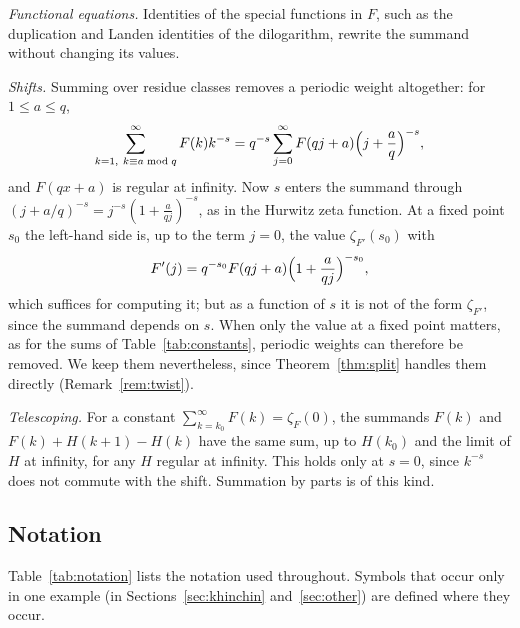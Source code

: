 \documentclass[11pt,reqno]{amsart}
\theoremstyle{definition}
\theoremstyle{remark}
\begin{document}
\emph{Functional equations.} Identities of the special functions in $F$, such as the duplication and Landen identities
of the dilogarithm, rewrite the summand without changing its values.

\emph{Shifts.} Summing over residue classes removes a periodic weight altogether: for $1 \le a \le q$,
\[
  \sum_{k=1,\ k\equiv a \bmod q}^{\infty}F(k)k^{-s} = q^{-s}\sum_{j=0}^{\infty}F(qj+a)\Bigl(j + \frac aq\Bigr)^{-s},
\]
and $F(qx+a)$ is regular at infinity. Now $s$ enters the summand through
$(j+a/q)^{-s} = j^{-s}(1+\frac{a}{qj})^{-s}$, as in the Hurwitz zeta function. At a fixed point $s_0$ the left-hand side
is, up to the term $j = 0$, the value $\zeta_{F'}(s_0)$ with
\[
  F'(j) = q^{-s_0}F(qj+a)\Bigl(1+\frac a{qj}\Bigr)^{-s_0},
\]
which suffices for computing it; but as a function of $s$ it is not of the form $\zeta_{F'}$, since the summand
depends on $s$. When only the value at a fixed point matters, as for the sums of Table~\ref{tab:constants}, periodic
weights can therefore be removed. We keep them nevertheless, since Theorem~\ref{thm:split} handles them directly
(Remark~\ref{rem:twist}).

\emph{Telescoping.} For a constant $\sum_{k=k_0}^{\infty}F(k) = \zeta_F(0)$, the summands $F(k)$ and
$F(k) + H(k+1) - H(k)$ have the same sum, up to $H(k_0)$ and the limit of $H$ at infinity, for any $H$ regular at
infinity. This holds only at $s = 0$, since $k^{-s}$ does not commute with the shift. Summation by parts is of this
kind.

\subsection{Notation}\label{sec:notation}
Table~\ref{tab:notation} lists the notation used throughout. Symbols that occur only in one example (in
Sections~\ref{sec:khinchin} and~\ref{sec:other}) are defined where they occur.
\end{document}
